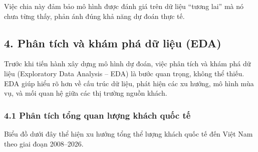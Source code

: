 \documentclass[11pt]{article}
\begin{document}
Việc chia này đảm bảo mô hình được đánh giá trên dữ liệu ``tương lai''
mà nó chưa từng thấy, phản ánh đúng khả năng dự đoán thực tế.

    \subsection{4. Phân tích và khám phá dữ liệu
(EDA)}\label{phuxe2n-tuxedch-vuxe0-khuxe1m-phuxe1-dux1eef-liux1ec7u-eda}

Trước khi tiến hành xây dựng mô hình dự đoán, việc phân tích và khám phá
dữ liệu (Exploratory Data Analysis -- EDA) là bước quan trọng, không thể
thiếu. EDA giúp hiểu rõ hơn về cấu trúc dữ liệu, phát hiện các xu hướng,
mô hình mùa vụ, và mối quan hệ giữa các thị trường nguồn khách.

\subsubsection{4.1 Phân tích tổng quan lượng khách quốc
tế}\label{phuxe2n-tuxedch-tux1ed5ng-quan-lux1b0ux1ee3ng-khuxe1ch-quux1ed1c-tux1ebf}

Biểu đồ dưới đây thể hiện xu hướng tổng thể lượng khách quốc tế đến Việt
Nam theo giai đoạn 2008--2026.
\end{document}
